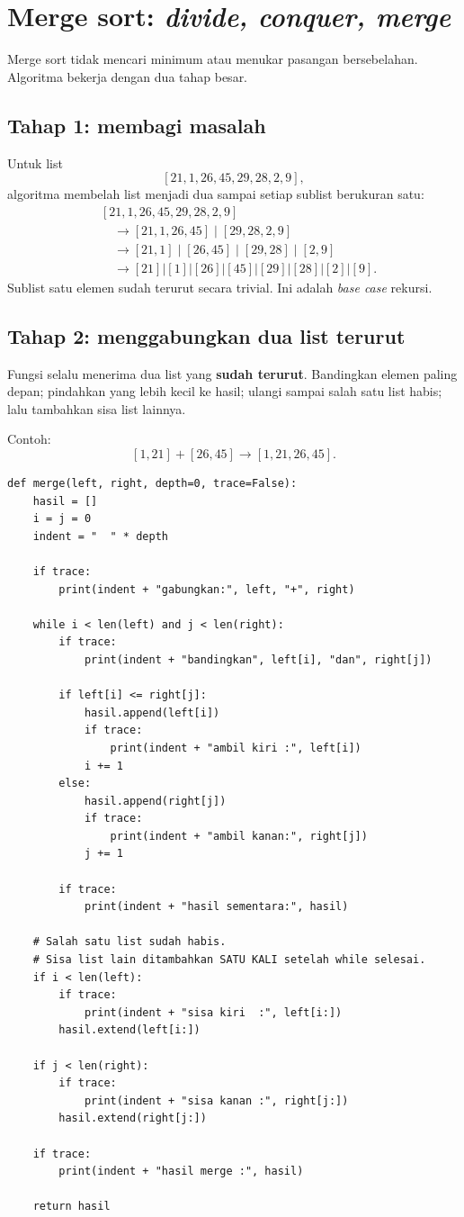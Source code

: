 \documentclass[11pt,a4paper]{report}
\newcommand{\kode}[1]{\texttt{\detokenize{#1}}}
\begin{document}
\section{Merge sort: \textit{divide, conquer, merge}}
Merge sort tidak mencari minimum atau menukar pasangan bersebelahan. Algoritma bekerja dengan dua tahap besar.

\subsection{Tahap 1: membagi masalah}
Untuk list
\[
[21,1,26,45,29,28,2,9],
\]
algoritma membelah list menjadi dua sampai setiap sublist berukuran satu:
\[
\begin{aligned}
&[21,1,26,45,29,28,2,9]\\
&\quad\to [21,1,26,45]\;|\;[29,28,2,9]\\
&\quad\to [21,1]\;|\;[26,45]\;|\;[29,28]\;|\;[2,9]\\
&\quad\to [21]|[1]|[26]|[45]|[29]|[28]|[2]|[9].
\end{aligned}
\]
Sublist satu elemen sudah terurut secara trivial. Ini adalah \textit{base case} rekursi.

\subsection{Tahap 2: menggabungkan dua list terurut}
Fungsi \kode{merge(left,right)} selalu menerima dua list yang \textbf{sudah terurut}. Bandingkan elemen paling depan; pindahkan yang lebih kecil ke hasil; ulangi sampai salah satu list habis; lalu tambahkan sisa list lainnya.

Contoh:
\[
[1,21] + [26,45] \longrightarrow [1,21,26,45].
\]

\begin{lstlisting}
def merge(left, right, depth=0, trace=False):
    hasil = []
    i = j = 0
    indent = "  " * depth

    if trace:
        print(indent + "gabungkan:", left, "+", right)

    while i < len(left) and j < len(right):
        if trace:
            print(indent + "bandingkan", left[i], "dan", right[j])

        if left[i] <= right[j]:
            hasil.append(left[i])
            if trace:
                print(indent + "ambil kiri :", left[i])
            i += 1
        else:
            hasil.append(right[j])
            if trace:
                print(indent + "ambil kanan:", right[j])
            j += 1

        if trace:
            print(indent + "hasil sementara:", hasil)

    # Salah satu list sudah habis.
    # Sisa list lain ditambahkan SATU KALI setelah while selesai.
    if i < len(left):
        if trace:
            print(indent + "sisa kiri  :", left[i:])
        hasil.extend(left[i:])

    if j < len(right):
        if trace:
            print(indent + "sisa kanan :", right[j:])
        hasil.extend(right[j:])

    if trace:
        print(indent + "hasil merge :", hasil)

    return hasil
\end{lstlisting}
\end{document}
